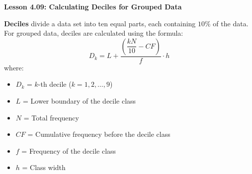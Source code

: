 \begin{center}
\textbf{Lesson 4.09: Calculating Deciles for Grouped Data}
\end{center}

\vspace*{-1.5ex}

\noindent \textbf{Deciles} divide a data set into ten equal parts, each containing \(10\%\) of the data. For grouped data, deciles are calculated using the formula:  
\[
D_k = L + \dfrac{\left(\dfrac{kN}{10} - CF\right)}{f} \cdot h
\]
where:  
\begin{itemize}
    \item \(D_k\) = \(k\)-th decile (\(k = 1, 2, \dots, 9\))
    \item \(L\) = Lower boundary of the decile class
    \item \(N\) = Total frequency
    \item \(CF\) = Cumulative frequency before the decile class
    \item \(f\) = Frequency of the decile class
    \item \(h\) = Class width
\end{itemize}

